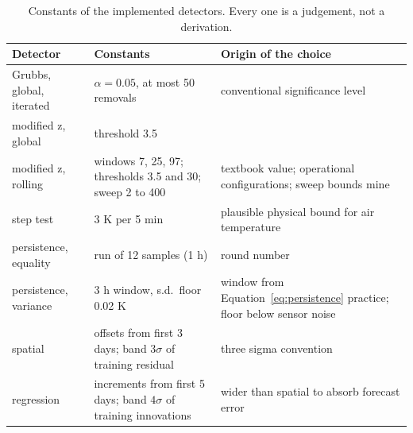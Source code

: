 \begin{table}[h]
  \centering
  \small
  \caption{Constants of the implemented detectors. Every one is a judgement,
  not a derivation.}
  \label{tab:detparams}
  \begin{tabular}{@{}lp{5.2cm}p{5.6cm}@{}}
    \toprule
    Detector & Constants & Origin of the choice \\
    \midrule
    Grubbs, global, iterated & $\alpha = 0.05$, at most 50 removals &
      conventional significance level \\
    modified z, global & threshold 3.5 & \citet{iglewicz1993} \\
    modified z, rolling & windows 7, 25, 97; thresholds 3.5 and 30;
      sweep 2 to 400 & textbook value; operational configurations;
      sweep bounds mine \\
    step test & 3 K per 5 min & plausible physical bound for air
      temperature \\
    persistence, equality & run of 12 samples (1 h) & round number \\
    persistence, variance & 3 h window, s.d.\ floor 0.02 K &
      window from Equation~\eqref{eq:persistence} practice; floor below
      sensor noise \\
    spatial & offsets from first 3 days; band $3\sigma$ of training
      residual & three sigma convention \\
    regression & increments from first 5 days; band $4\sigma$ of training
      innovations & wider than spatial to absorb forecast error \\
    \bottomrule
  \end{tabular}
\end{table}

